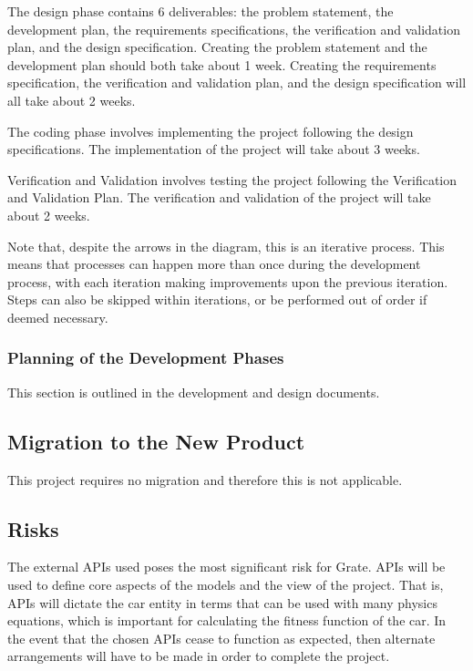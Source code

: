 \documentclass[12pt, titlepage]{article}
\begin{document}
The design phase contains 6 deliverables: the problem statement, the development 
plan, the requirements specifications, the verification and validation plan, and 
the design specification. Creating the problem statement and the development 
plan should both take about 1 week. Creating the requirements specification, the 
verification and validation plan, and the design specification will all take 
about 2 weeks.

The coding phase involves implementing the project following the design 
specifications. The implementation of the project will take about 3 weeks.

Verification and Validation involves testing the project following the 
Verification and Validation Plan. The verification and validation of the project 
will take about 2 weeks.

Note that, despite the arrows in the diagram, this is an iterative process. This 
means that processes can happen more than once during the development process, 
with each iteration making improvements upon the previous iteration. Steps can 
also be skipped within iterations, or be performed out of order if deemed 
necessary. 

\subsubsection{Planning of the Development Phases}
This section is outlined in the development and design documents.

\subsection{Migration to the New Product}
This project requires no migration and therefore this is not applicable.

\subsection{Risks}

The external APIs used poses the most significant risk for Grate. APIs will be 
used to define core aspects of the models and the view of the project. That is, 
APIs will dictate the car entity in terms that can be used with many physics 
equations, which is important for calculating the fitness function of the car. 
In the event that the chosen APIs cease to function as expected, then alternate 
arrangements will have to be made in order to complete the project. 
\end{document}
